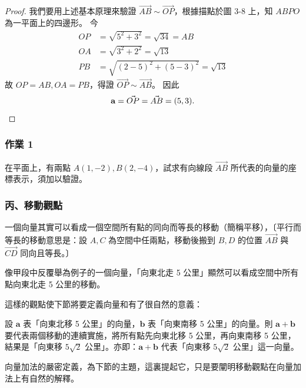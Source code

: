 \begin{proof}
我們要用上述基本原理來驗證 $\vec{AB} \sim \vec{OP}$，根據描點於圖 3-8 上，知 $ABPO$ 為一平面上的四邊形。
今
\begin{align*}
OP &= \sqrt{5^2 + 3^2} = \sqrt{34} = AB \\
OA &= \sqrt{3^2 + 2^2} = \sqrt{13} \\
PB &= \sqrt{(2 - 5)^2 + (5 - 3)^2} = \sqrt{13}
\end{align*}
故 $OP = AB, OA = PB$，得證 $\vec{OP} \sim \vec{AB}$。
因此
\[ \mathbf{a} = \vec{OP} = \vec{AB} = (5, 3). \qedhere \]
\end{proof}

\subsubsection*{作業 1}
在平面上，有兩點 $A(1, -2), B(2, -4)$，試求有向線段 $\vec{AB}$ 所代表的向量的座標表示，須加以驗證。

\subsubsection*{丙、移動觀點}

一個向量其實可以看成一個空間所有點的同向而等長的移動（簡稱平移），〔平行而等長的移動意思是：設 $A, C$ 為空間中任兩點，移動後搬到 $B, D$ 的位置 $\vec{AB}$ 與 $\vec{CD}$ 同向且等長。〕

像甲段中反覆舉為例子的一個向量，「向東北走 5 公里」顯然可以看成空間中所有點向東北走 5 公里的移動。

這樣的觀點使下節將要定義向量和有了很自然的意義：

設 $\mathbf{a}$ 表「向東北移 5 公里」的向量，$\mathbf{b}$ 表「向東南移 5 公里」的向量。則 $\mathbf{a} + \mathbf{b}$ 要代表兩個移動的連續實施，將所有點先向東北移 5 公里，再向東南移 5 公里，結果是「向東移 $5\sqrt{2}$ 公里」。亦即：$\mathbf{a} + \mathbf{b}$ 代表「向東移 $5\sqrt{2}$ 公里」這一向量。

向量加法的嚴密定義，為下節的主題，這裏提起它，只是要闡明移動觀點在向量加法上有自然的解釋。

